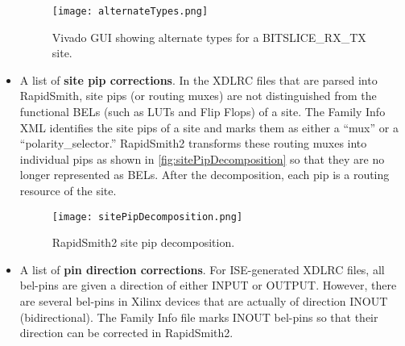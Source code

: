 \begin{itemize}
    \begin{figure}[H]
    \centering
    \texttt{[image: alternateTypes.png]}
    \caption{Vivado GUI showing alternate types for a BITSLICE\_RX\_TX site.}
    \label{fig:alternateTypes}
  \end{figure}
  
  \item A list of \textbf{site pip corrections}. In the XDLRC files that are
  parsed into RapidSmith, site pips (or routing muxes) are not distinguished
  from the functional BELs (such as LUTs and Flip Flops) of a site. The
  Family Info XML identifies the site pips of a site and marks them as either
  a ``mux'' or a ``polarity\_selector.'' RapidSmith2 transforms these routing
  muxes into individual pips as shown in \autoref{fig:sitePipDecomposition} so
  that they are no longer represented as BELs. After the decomposition, each pip
  is a routing resource of the site.
  
  \begin{figure}[H]
    \centering
    \texttt{[image: sitePipDecomposition.png]}
    \caption{RapidSmith2 site pip decomposition.}
    \label{fig:sitePipDecomposition}
  \end{figure}
  
  \item A list of \textbf{pin direction corrections}. For ISE-generated XDLRC
  files, all bel-pins are given a direction of either INPUT or OUTPUT. However,
  there are several bel-pins in Xilinx devices that are actually of direction
  INOUT (bidirectional). The Family Info file marks INOUT bel-pins so that
  their direction can be corrected in RapidSmith2.
  
  
\end{itemize} 
